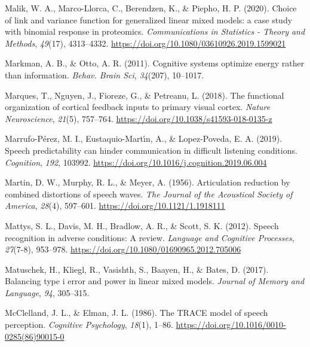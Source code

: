 \documentclass[a4paper, nobind]{templates/ociamthesis}
\newlength{\cslhangindent}
\newenvironment{CSLReferences}[2] %
 {%
  \setlength{\parindent}{0pt}
  \ifodd #1
  \let\oldpar\par
  \def\par{\hangindent=\cslhangindent\oldpar}
  \fi
  \setlength{\parskip}{1mm}
  \setlength{\baselineskip}{6mm}
 }%
 {}
\begin{document}
\begin{CSLReferences}{1}{0}
\leavevmode{}%
Malik, W. A., Marco-Llorca, C., Berendzen, K., \& Piepho, H. P. (2020). {Choice of link and variance function for generalized linear mixed models: a case study with binomial response in proteomics}. \emph{Communications in Statistics - Theory and Methods}, \emph{49}(17), 4313--4332. \url{https://doi.org/10.1080/03610926.2019.1599021}

\leavevmode{}%
Markman, A. B., \& Otto, A. R. (2011). Cognitive systems optimize energy rather than information. \emph{Behav. Brain Sci}, \emph{34}(207), 10--1017.

\leavevmode{}%
Marques, T., Nguyen, J., Fioreze, G., \& Petreanu, L. (2018). The functional organization of cortical feedback inputs to primary visual cortex. \emph{Nature Neuroscience}, \emph{21}(5), 757--764. \url{https://doi.org/10.1038/s41593-018-0135-z}

\leavevmode{}%
Marrufo-Pérez, M. I., Eustaquio-Martı́n, A., \& Lopez-Poveda, E. A. (2019). Speech predictability can hinder communication in difficult listening conditions. \emph{Cognition}, \emph{192}, 103992. \url{https://doi.org/10.1016/j.cognition.2019.06.004}

\leavevmode{}%
Martin, D. W., Murphy, R. L., \& Meyer, A. (1956). {Articulation reduction by combined distortions of speech waves}. \emph{The Journal of the Acoustical Society of America}, \emph{28}(4), 597--601. \url{https://doi.org/10.1121/1.1918111}

\leavevmode{}%
Mattys, S. L., Davis, M. H., Bradlow, A. R., \& Scott, S. K. (2012). {Speech recognition in adverse conditions: A review}. \emph{Language and Cognitive Processes}, \emph{27}(7-8), 953--978. \url{https://doi.org/10.1080/01690965.2012.705006}

\leavevmode{}%
Matuschek, H., Kliegl, R., Vasishth, S., Baayen, H., \& Bates, D. (2017). Balancing type i error and power in linear mixed models. \emph{Journal of Memory and Language}, \emph{94}, 305--315.

\leavevmode{}%
McClelland, J. L., \& Elman, J. L. (1986). {The TRACE model of speech perception}. \emph{Cognitive Psychology}, \emph{18}(1), 1--86. \url{https://doi.org/10.1016/0010-0285(86)90015-0}


\end{CSLReferences}
\end{document}
